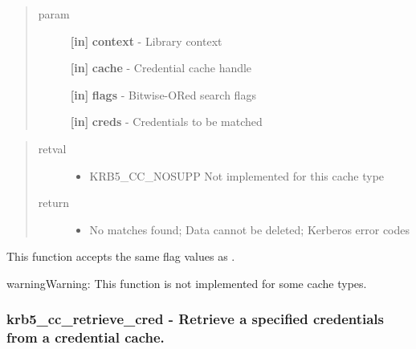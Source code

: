 \documentclass[letterpaper,10pt,english]{sphinxmanual}
\begin{document}
\begin{quote}\begin{description}
\item[{param}] \leavevmode
\textbf{{[}in{]}} \textbf{context} - Library context

\textbf{{[}in{]}} \textbf{cache} - Credential cache handle

\textbf{{[}in{]}} \textbf{flags} - Bitwise-ORed search flags

\textbf{{[}in{]}} \textbf{creds} - Credentials to be matched

\end{description}\end{quote}
\begin{quote}\begin{description}
\item[{retval}] \leavevmode\begin{itemize}
\item {} 
KRB5\_CC\_NOSUPP   Not implemented for this cache type

\end{itemize}

\item[{return}] \leavevmode\begin{itemize}
\item {} 
No matches found; Data cannot be deleted; Kerberos error codes

\end{itemize}

\end{description}\end{quote}

This function accepts the same flag values as {\hyperref[appdev/refs/api/krb5_cc_retrieve_cred:krb5_cc_retrieve_cred]{}} .

\begin{notice}{warning}{Warning:}
This function is not implemented for some cache types.
\end{notice}


\subsubsection{krb5\_cc\_retrieve\_cred -  Retrieve a specified credentials from a credential cache.}
\label{appdev/refs/api/krb5_cc_retrieve_cred:krb5-cc-retrieve-cred-retrieve-a-specified-credentials-from-a-credential-cache}\label{appdev/refs/api/krb5_cc_retrieve_cred::doc}
\end{document}

